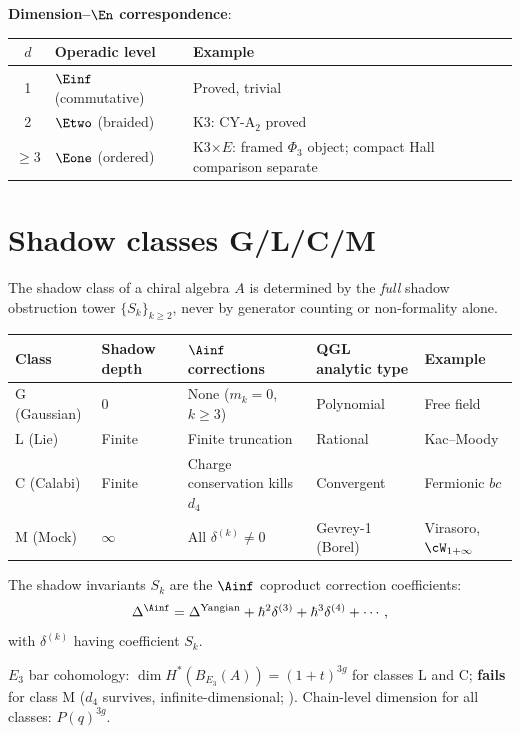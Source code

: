 \noindent
\textbf{Dimension--$\En$ correspondence}:
\begin{center}
\begin{tabular}{@{}cll@{}}
\toprule
$d$ & Operadic level & Example \\
\midrule
1 & $\Einf$ (commutative) & Proved, trivial \\
2 & $\Etwo$ (braided) & K3: CY-A$_2$ proved \\
$\ge 3$ & $\Eone$ (ordered) & K3$\times E$: framed $\Phi_3$ object; compact Hall comparison separate \\
\bottomrule
\end{tabular}
\end{center}

\section{Shadow classes G/L/C/M}
\label{sec:nc-shadow}

The shadow class of a chiral algebra $A$ is determined by the
\emph{full} shadow obstruction tower $\{S_k\}_{k \ge 2}$, never by
generator counting or non-formality alone.

\begin{center}
\begin{tabular}{@{}lllll@{}}
\toprule
\textbf{Class} & \textbf{Shadow depth} & \textbf{$\Ainf$ corrections}
 & \textbf{QGL analytic type} & \textbf{Example} \\
\midrule
G (Gaussian) & 0 & None ($m_k = 0$, $k \ge 3$) & Polynomial & Free field \\
L (Lie) & Finite & Finite truncation & Rational & Kac--Moody \\
C (Calabi) & Finite & Charge conservation kills $d_4$ & Convergent
 & Fermionic $bc$ \\
M (Mock) & $\infty$ & All $\delta^{(k)} \neq 0$ & Gevrey-1 (Borel)
 & Virasoro, $\cW_{1+\infty}$ \\
\bottomrule
\end{tabular}
\end{center}

\noindent
The shadow invariants $S_k$ are the $\Ainf$ coproduct correction
coefficients:
\[
 \Delta^{\Ainf} = \Delta^{\mathrm{Yangian}} + \hbar^2 \delta^{(3)}
 + \hbar^3 \delta^{(4)} + \cdots,
\]
with $\delta^{(k)}$ having coefficient $S_k$.

\medskip\noindent
$E_3$ bar cohomology:
$\dim H^*(B_{E_3}(A)) = (1+t)^{3g}$ for classes L and C;
\textbf{fails} for class M ($d_4$ survives, infinite-dimensional;
). Chain-level dimension for all classes: $P(q)^{3g}$.

